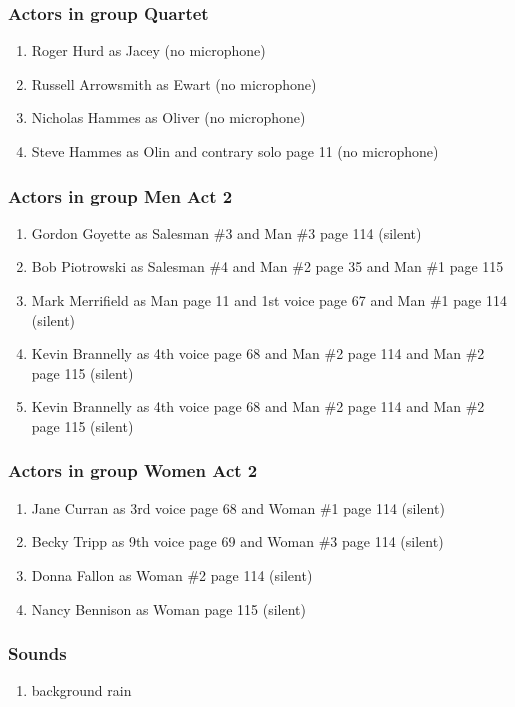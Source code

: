 \subsubsection{Actors in group Quartet}
\begin{enumerate}
\item Roger Hurd as Jacey (no microphone)
\item Russell Arrowsmith as Ewart (no microphone)
\item Nicholas Hammes as Oliver (no microphone)
\item Steve Hammes as Olin and contrary solo page 11 (no microphone)
\end{enumerate}
\subsubsection{Actors in group Men Act 2}
\begin{enumerate}
\item Gordon Goyette as Salesman \#3 and Man \#3 page 114 (silent)
\item Bob Piotrowski as Salesman \#4 and Man \#2 page 35 and Man \#1 page 115
\item Mark Merrifield as Man page 11 and 1st voice page 67 and Man \#1 page 114 (silent)
\item Kevin Brannelly as 4th voice page 68 and Man \#2 page 114 and Man \#2 page 115 (silent)
\item Kevin Brannelly as 4th voice page 68 and Man \#2 page 114 and Man \#2 page 115 (silent)
\end{enumerate}
\subsubsection{Actors in group Women Act 2}
\begin{enumerate}
\item Jane Curran as 3rd voice page 68 and Woman \#1 page 114 (silent)
\item Becky Tripp as 9th voice page 69 and Woman \#3 page 114 (silent)
\item Donna Fallon as Woman \#2 page 114 (silent)
\item Nancy Bennison as Woman page 115 (silent)
\end{enumerate}

\subsubsection{Sounds}
\begin{enumerate}
\item background rain
\end{enumerate}
